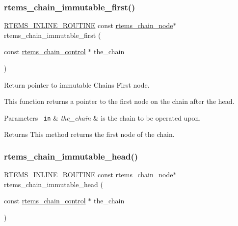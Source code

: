 \subsubsection{\texorpdfstring{rtems\_chain\_immutable\_first()}{rtems\_chain\_immutable\_first()}}
{\footnotesize\ttfamily \mbox{\hyperlink{group__RTEMSScoreBaseDefs_gac216239df231d5dbd15e3520b0b9313f}{R\+T\+E\+M\+S\+\_\+\+I\+N\+L\+I\+N\+E\+\_\+\+R\+O\+U\+T\+I\+NE}} const \mbox{\hyperlink{structChain__Node__struct}{rtems\+\_\+chain\+\_\+node}}$\ast$ rtems\+\_\+chain\+\_\+immutable\+\_\+first (\begin{DoxyParamCaption}\item[{const \mbox{\hyperlink{unionChain__Control}{rtems\+\_\+chain\+\_\+control}} $\ast$}]{the\+\_\+chain }\end{DoxyParamCaption})}



Return pointer to immutable Chain\textquotesingle{}s First node. 

This function returns a pointer to the first node on the chain after the head.


\begin{DoxyParams}[1]{Parameters}
\mbox{\texttt{ in}}  & {\em the\+\_\+chain} & is the chain to be operated upon.\\
\hline
\end{DoxyParams}
\begin{DoxyReturn}{Returns}
This method returns the first node of the chain. 
\end{DoxyReturn}
\mbox{\label{group__ClassicChains_ga775171784e4b0de791519f2853519edb}} 
\subsubsection{\texorpdfstring{rtems\_chain\_immutable\_head()}{rtems\_chain\_immutable\_head()}}
{\footnotesize\ttfamily \mbox{\hyperlink{group__RTEMSScoreBaseDefs_gac216239df231d5dbd15e3520b0b9313f}{R\+T\+E\+M\+S\+\_\+\+I\+N\+L\+I\+N\+E\+\_\+\+R\+O\+U\+T\+I\+NE}} const \mbox{\hyperlink{structChain__Node__struct}{rtems\+\_\+chain\+\_\+node}}$\ast$ rtems\+\_\+chain\+\_\+immutable\+\_\+head (\begin{DoxyParamCaption}\item[{const \mbox{\hyperlink{unionChain__Control}{rtems\+\_\+chain\+\_\+control}} $\ast$}]{the\+\_\+chain }\end{DoxyParamCaption})}



